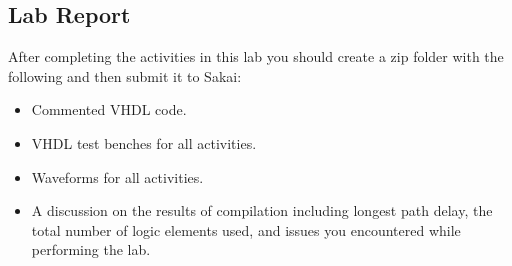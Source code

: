 \subsection{Lab Report}
After completing the activities in this lab you should create a zip folder with the following and then submit it to Sakai:

\begin{itemize}
	\item Commented VHDL code.
	\item VHDL test benches for all activities.
	\item Waveforms for all activities.
	\item A discussion on the results of compilation including longest path delay, the total number of logic elements used, and issues you encountered while performing the lab.
\end{itemize}
